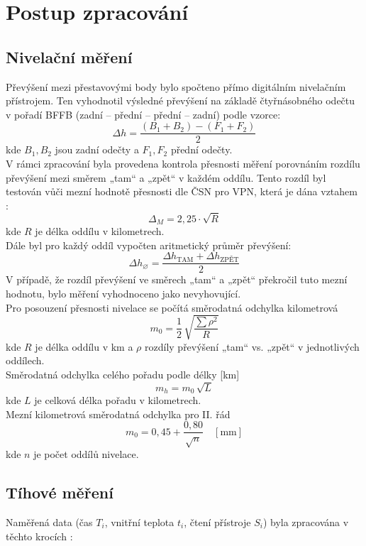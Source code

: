 \section{Postup zpracování}

\subsection{Nivelační měření}

Převýšení mezi přestavovými body bylo spočteno přímo digitálním nivelačním přístrojem. Ten vyhodnotil výsledné převýšení na základě čtyřnásobného odečtu v pořadí BFFB (zadní – přední – přední – zadní) podle vzorce:
\[
\Delta h = \frac{(B_1 + B_2) - (F_1 + F_2)}{2}
\]
kde \( B_1, B_2 \) jsou zadní odečty a \( F_1, F_2 \) přední odečty.\\
V rámci zpracování byla provedena kontrola přesnosti měření porovnáním rozdílu převýšení mezi směrem „tam“ a „zpět“ v každém oddílu. Tento rozdíl byl testován vůči mezní hodnotě přesnosti dle ČSN pro VPN, která je dána vztahem \cite{skorepa}:
\[
\Delta_M = 2,25 \cdot \sqrt{R}
\]
kde \( R \) je délka oddílu v kilometrech.\\
Dále byl pro každý oddíl vypočten aritmetický průměr převýšení:
\[
\Delta h_{\diameter} = \frac{\Delta h_{\text{TAM}} + \Delta h_{\text{ZPĚT}}}{2}
\]
V případě, že rozdíl převýšení ve směrech „tam“ a „zpět“ překročil tuto mezní hodnotu, bylo měření vyhodnoceno jako nevyhovující.\cite{zadani}\\
Pro posouzení přesnosti nivelace se počítá směrodatná odchylka kilometrová
\[
  m_0 = \frac{1}{2}\,\sqrt{\frac{\sum\rho^2}{R}}
\]
kde \( R \) je délka oddílu v km a \(\rho\) rozdíly převýšení „tam“ vs. „zpět“ v jednotlivých oddílech.\\
Směrodatná odchylka celého pořadu podle délky [km]
\[
  m_h = m_0 \,\sqrt{L}
\]
kde \(L\) je celková délka pořadu v kilometrech.\\
Mezní kilometrová směrodatná odchylka pro II. řád
\[
  m_0 = 0{,}45 + \frac{0{,}80}{\sqrt{n}}\quad [\mathrm{mm}]
\]
kde \(n\) je počet oddílů nivelace.

\subsection{Tíhové měření}

Naměřená data (čas \(T_i\), vnitřní teplota \(t_i\), čtení přístroje \(S_i\)) byla zpracována v těchto krocích \cite{gravi}:

